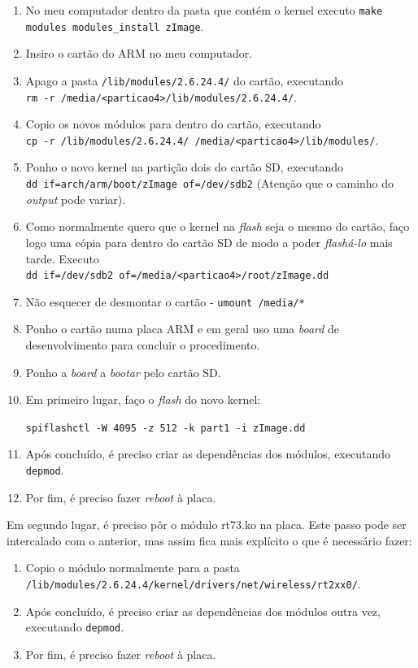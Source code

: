 \documentclass[10pt,a4paper,oneside]{book}
\begin{document}
	\begin{enumerate}
		\item No meu computador dentro da pasta que contém o kernel executo {\tt make modules modules\_install zImage}.
		\item Insiro  o cartão do ARM no meu computador.
		\item Apago a pasta {\tt /lib/modules/2.6.24.4/} do cartão, executando\\ {\tt rm -r /media/<particao4>/lib/modules/2.6.24.4/}.
		\item Copio os novos módulos para dentro do cartão, executando\\ {\tt cp -r /lib/modules/2.6.24.4/ /media/<particao4>/lib/modules/}.
		\item Ponho o novo kernel na partição dois do cartão SD, executando\\ {\tt dd if=arch/arm/boot/zImage of=/dev/sdb2} (Atenção que o caminho do \emph{output} pode variar).
		\item Como normalmente quero que o kernel na \emph{flash} seja o mesmo do cartão, faço logo uma cópia para dentro do cartão SD de modo a poder \emph{flashá-lo} mais tarde. Executo \\{\tt dd if=/dev/sdb2 of=/media/<particao4>/root/zImage.dd}
		\item Não esquecer de desmontar o cartão - {\tt umount /media/*}
		\item Ponho o cartão numa placa ARM e em geral uso uma \emph{board} de desenvolvimento para concluir o procedimento.
		\item Ponho a \emph{board} a \emph{bootar} pelo cartão SD.
		\item Em primeiro lugar, faço o \emph{flash} do novo kernel:
			\begin{flushleft}
				{\tt spiflashctl -W 4095 -z 512 -k part1 -i zImage.dd}
			\end{flushleft}
		\item Após concluído, é preciso criar as dependências dos módulos, executando {\tt depmod}.
		\item Por fim, é preciso fazer \emph{reboot} à placa.
	\end{enumerate}

	Em segundo lugar, é preciso pôr o módulo rt73.ko na placa. Este passo pode ser intercalado com o anterior, mas assim fica mais explícito o que é necessário fazer:
	
	\begin{enumerate}
		\item Copio o módulo normalmente para a pasta\\
		 {\tt /lib/modules/2.6.24.4/kernel/drivers/net/wireless/rt2xx0/}.
		\item Após concluído, é preciso criar as dependências dos módulos outra vez, executando {\tt depmod}.
		\item Por fim, é preciso fazer \emph{reboot} à placa.
	\end{enumerate}
	
\end{document}
